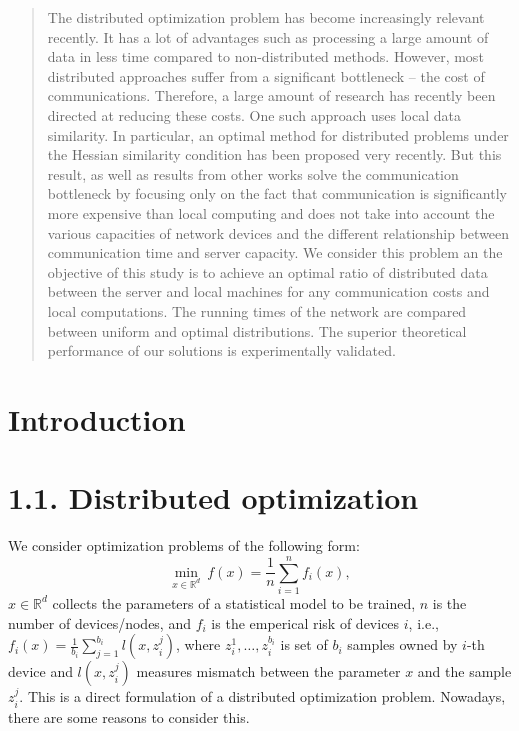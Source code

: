 \documentclass{article}
\theoremstyle{definition}
\theoremstyle{plain}
\begin{document}
\begin{abstract}
The distributed optimization problem has become increasingly relevant recently. It has a lot of advantages such as processing a large amount of data in less time compared to non-distributed methods. However, most distributed approaches suffer from a significant bottleneck -- the cost of communications. Therefore, a large amount of research has recently been directed at reducing these costs. One such approach uses local data similarity. In particular, an optimal method for distributed problems under the Hessian similarity condition has been proposed very recently. But this result, as well as results from other works solve the communication bottleneck by focusing only on the fact that communication is significantly more expensive than local computing and does not take into account the various capacities of network devices and the different relationship between communication time and server capacity. We consider this problem an the objective of this study is to achieve an optimal ratio of distributed data between the server and local machines for any communication costs and local computations. The running times of the network are compared between uniform and optimal distributions. The superior theoretical performance of our solutions is experimentally validated.
\end{abstract}


\section{Introduction}

\section*{1.1. Distributed optimization}

We consider optimization problems of the following form:
\begin{equation}
    \label{eq:1}
    \underset{x\in \mathbb{R}^d}{\min} ~ f(x) = \frac{1}{n} \sum \limits_{i = 1}^{n} f _i(x),
\end{equation}
$x\in\mathbb{R}^d$ collects the parameters of a statistical model to be trained, $n$ is the number of devices/nodes, and $f_i$ is the emperical risk of devices $i$, i.e., $f_i(x) = \frac{1}{b_i}\sum_{j = 1}^{b_i} l(x, z_i^j)$, where $z_i^1, \ldots ,z_i^{b_i}$ is set of $b_i$ samples owned by $i$-th device and $l(x, z_i^j)$ measures mismatch between the parameter $x$ and the sample $z_i^j$. This is a direct formulation of a distributed optimization problem. Nowadays, there are some reasons to consider this.
\end{document}
